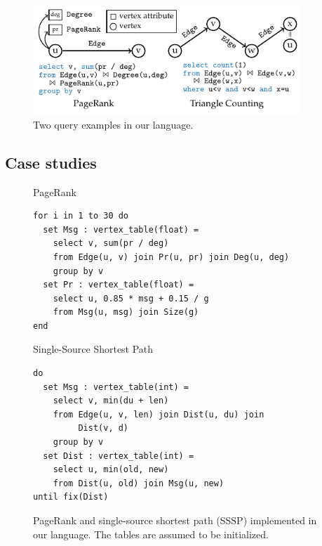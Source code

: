 \documentclass{sokendai_thesis} %
\begin{document}
\begin{figure}
\includegraphics[width=0.9\textwidth]{figures/syntax-example.pdf}
\caption{Two query examples in our language.}
\label{fig:join-syntax}
\end{figure}

\subsection{Case studies}
\label{sec:algorithms}

\begin{figure}
PageRank
\begin{lstlisting}[language=sql-graph,frame=single]
for i in 1 to 30 do
  set Msg : vertex_table(float) =
    select v, sum(pr / deg)
    from Edge(u, v) join Pr(u, pr) join Deg(u, deg)
    group by v
  set Pr : vertex_table(float) =
    select u, 0.85 * msg + 0.15 / g
    from Msg(u, msg) join Size(g)
end
\end{lstlisting}
Single-Source Shortest Path
\begin{lstlisting}[language=sql-graph,frame=single]
do
  set Msg : vertex_table(int) =
    select v, min(du + len)
    from Edge(u, v, len) join Dist(u, du) join
         Dist(v, d)
    group by v
  set Dist : vertex_table(int) =
    select u, min(old, new)
    from Dist(u, old) join Msg(u, new)
until fix(Dist)
\end{lstlisting}
\caption{PageRank and single-source shortest path (SSSP) implemented in our language. The tables are assumed to be initialized.}
\label{fig:algorithms}
\vspace{-5pt}
\end{figure}
\end{document}
